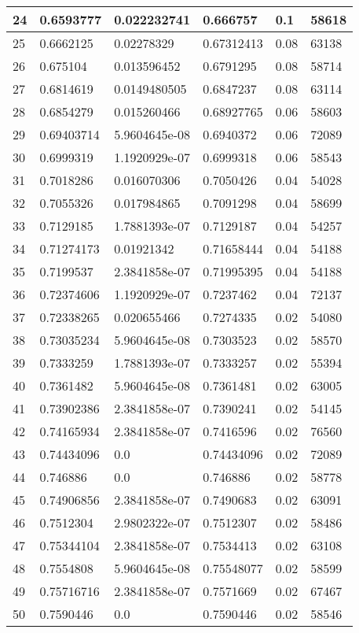\begin{longtable}{|l|l|l|l|l|l|}
24 & 0.6593777 & 0.022232741 & 0.666757 & 0.1 & 58618 \\ \hline 
25 & 0.6662125 & 0.02278329 & 0.67312413 & 0.08 & 63138 \\ \hline 
26 & 0.675104 & 0.013596452 & 0.6791295 & 0.08 & 58714 \\ \hline 
27 & 0.6814619 & 0.0149480505 & 0.6847237 & 0.08 & 63114 \\ \hline 
28 & 0.6854279 & 0.015260466 & 0.68927765 & 0.06 & 58603 \\ \hline 
29 & 0.69403714 & 5.9604645e-08 & 0.6940372 & 0.06 & 72089 \\ \hline 
30 & 0.6999319 & 1.1920929e-07 & 0.6999318 & 0.06 & 58543 \\ \hline 
31 & 0.7018286 & 0.016070306 & 0.7050426 & 0.04 & 54028 \\ \hline 
32 & 0.7055326 & 0.017984865 & 0.7091298 & 0.04 & 58699 \\ \hline 
33 & 0.7129185 & 1.7881393e-07 & 0.7129187 & 0.04 & 54257 \\ \hline 
34 & 0.71274173 & 0.01921342 & 0.71658444 & 0.04 & 54188 \\ \hline 
35 & 0.7199537 & 2.3841858e-07 & 0.71995395 & 0.04 & 54188 \\ \hline 
36 & 0.72374606 & 1.1920929e-07 & 0.7237462 & 0.04 & 72137 \\ \hline 
37 & 0.72338265 & 0.020655466 & 0.7274335 & 0.02 & 54080 \\ \hline 
38 & 0.73035234 & 5.9604645e-08 & 0.7303523 & 0.02 & 58570 \\ \hline 
39 & 0.7333259 & 1.7881393e-07 & 0.7333257 & 0.02 & 55394 \\ \hline 
40 & 0.7361482 & 5.9604645e-08 & 0.7361481 & 0.02 & 63005 \\ \hline 
41 & 0.73902386 & 2.3841858e-07 & 0.7390241 & 0.02 & 54145 \\ \hline 
42 & 0.74165934 & 2.3841858e-07 & 0.7416596 & 0.02 & 76560 \\ \hline 
43 & 0.74434096 & 0.0 & 0.74434096 & 0.02 & 72089 \\ \hline 
44 & 0.746886 & 0.0 & 0.746886 & 0.02 & 58778 \\ \hline 
45 & 0.74906856 & 2.3841858e-07 & 0.7490683 & 0.02 & 63091 \\ \hline 
46 & 0.7512304 & 2.9802322e-07 & 0.7512307 & 0.02 & 58486 \\ \hline 
47 & 0.75344104 & 2.3841858e-07 & 0.7534413 & 0.02 & 63108 \\ \hline 
48 & 0.7554808 & 5.9604645e-08 & 0.75548077 & 0.02 & 58599 \\ \hline 
49 & 0.75716716 & 2.3841858e-07 & 0.7571669 & 0.02 & 67467 \\ \hline 
50 & 0.7590446 & 0.0 & 0.7590446 & 0.02 & 58546 \\ \hline 
\end{longtable}